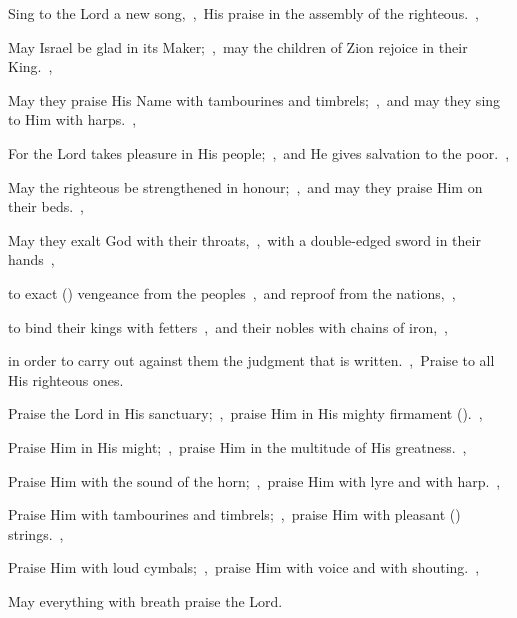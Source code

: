 \documentclass[12pt,twoside,a5paper]{article}
\begin{document}
\begin{normalparskip}
  Sing to the Lord a new song,~\sep\ His praise in the assembly of the righteous.~\sep


  May Israel be glad in its Maker;~\sep\ may the children of Zion rejoice in their King.~\sep

  May they praise His Name with tambourines and timbrels;~\sep\ and may they sing to Him with harps.~\sep

  For the Lord takes pleasure in His people;~\sep\ and He gives salvation to the poor.~\sep

  May the righteous be strengthened in honour;~\sep\ and may they praise Him on their beds.~\sep

  May they exalt God with their throats,~\sep\ with a double-edged sword in their hands~\sep

  to exact () vengeance from the peoples~\sep\ and reproof from the nations,~\sep

  to bind their kings with fetters~\sep\ and their nobles with chains of iron,~\sep

  in order to carry out against them the judgment that is written.~\sep\ Praise to all His righteous ones.
\end{normalparskip}


\begin{normalparskip}
  Praise the Lord in His sanctuary;~\sep\ praise Him in His mighty firmament ().~\sep


  Praise Him in His might;~\sep\ praise Him in the multitude of His greatness.~\sep

  Praise Him with the sound of the horn;~\sep\ praise Him with lyre and with harp.~\sep

  Praise Him with tambourines and timbrels;~\sep\ praise Him with pleasant () strings.~\sep

  Praise Him with loud cymbals;~\sep\ praise Him with voice and with shouting.~\sep

  May everything with breath praise the Lord.
\end{normalparskip}

\end{document}
